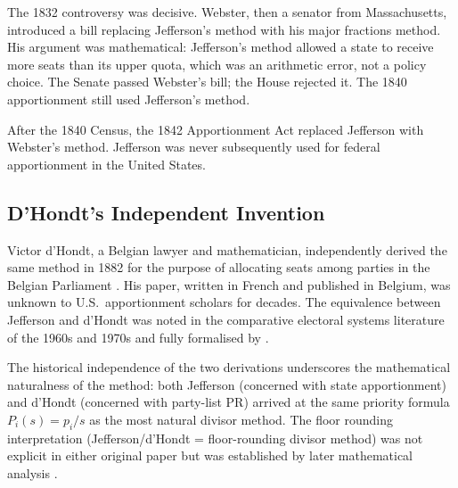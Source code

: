 The 1832 controversy was decisive.
Webster, then a senator from Massachusetts, introduced a bill replacing
Jefferson's method with his major fractions method.
His argument was mathematical: Jefferson's method allowed a state to
receive more seats than its upper quota, which was an arithmetic
error, not a policy choice.
The Senate passed Webster's bill; the House rejected it.
The 1840 apportionment still used Jefferson's method.

After the 1840 Census, the 1842 Apportionment Act replaced Jefferson
with Webster's method.
Jefferson was never subsequently used for federal apportionment in
the United States.

\subsection{D'Hondt's Independent Invention}

Victor d'Hondt, a Belgian lawyer and mathematician, independently
derived the same method in 1882 for the purpose of allocating seats
among parties in the Belgian Parliament \citep{dhondt1882systeme}.
His paper, written in French and published in Belgium,
was unknown to U.S.\ apportionment scholars for decades.
The equivalence between Jefferson and d'Hondt was noted in the
comparative electoral systems literature of the 1960s and 1970s
and fully formalised by \citet{balinski1982fair}.

The historical independence of the two derivations underscores the
mathematical naturalness of the method: both Jefferson (concerned with
state apportionment) and d'Hondt (concerned with party-list PR)
arrived at the same priority formula $P_i(s) = p_i/s$
as the most natural divisor method.
The floor rounding interpretation (Jefferson/d'Hondt = floor-rounding
divisor method) was not explicit in either original paper but
was established by later mathematical analysis \citep{balinski1982fair}.
